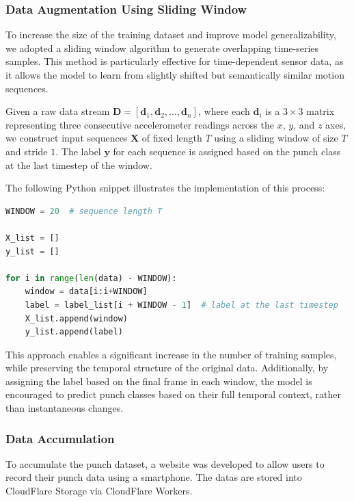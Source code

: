 \documentclass{article}
\begin{document}
    \subsubsection{Data Augmentation Using Sliding Window}

    To increase the size of the training dataset and improve model generalizability,
    we adopted a sliding window algorithm to generate overlapping time-series
    samples. This method is particularly effective for time-dependent sensor data,
    as it allows the model to learn from slightly shifted but semantically
    similar motion sequences.

    Given a raw data stream
    $\mathbf{D}= [\mathbf{d}_{1}, \mathbf{d}_{2}, ..., \mathbf{d}_{n}]$, where each
    $\mathbf{d}_{i}$ is a $3 \times 3$ matrix representing three consecutive accelerometer
    readings across the $x$, $y$, and $z$ axes, we construct input sequences
    $\mathbf{X}$ of fixed length $T$ using a sliding window of size $T$ and
    stride $1$. The label $\mathbf{y}$ for each sequence is assigned based on the
    punch class at the last timestep of the window.

    The following Python snippet illustrates the implementation of this process:

    \begin{lstlisting}[language=Python, caption={Sliding window algorithm for data augmentation}]
WINDOW = 20  # sequence length T

X_list = []
y_list = []

for i in range(len(data) - WINDOW):
    window = data[i:i+WINDOW]
    label = label_list[i + WINDOW - 1]  # label at the last timestep
    X_list.append(window)
    y_list.append(label)
\end{lstlisting}

    This approach enables a significant increase in the number of training
    samples, while preserving the temporal structure of the original data.
    Additionally, by assigning the label based on the final frame in each window,
    the model is encouraged to predict punch classes based on their full
    temporal context, rather than instantaneous changes.

    \subsubsection{Data Accumulation}
    To accumulate the punch dataset, a website was developed to allow users to
    record their punch data using a smartphone. The datas are stored into CloudFlare
    Storage via CloudFlare Workers.
\end{document}

